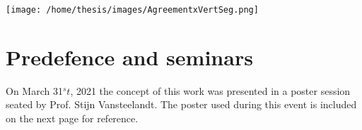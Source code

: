 \texttt{[image: /home/thesis/images/AgreementxVertSeg.png]}

\chapter{Predefence and seminars}
\par{
  On March 31$^st$, 2021 the concept of this work was presented in a poster session seated by Prof. Stijn Vansteelandt.
The poster used during this event is included on the next page for reference.
}





